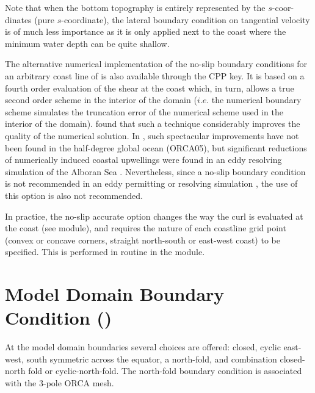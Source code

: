 \documentclass[NEMO_book]{subfiles}
\begin{document}
Note that when the bottom topography is entirely represented by the $s$-coor-dinates 
(pure $s$-coordinate), the lateral boundary condition on tangential velocity is of much 
less importance as it is only applied next to the coast where the minimum water depth 
can be quite shallow.

The alternative numerical implementation of the no-slip boundary conditions for an 
arbitrary coast line of \citet{Shchepetkin1996} is also available through the 
 CPP key. It is based on a fourth order evaluation of the shear at the 
coast which, in turn, allows a true second order scheme in the interior of the domain 
($i.e.$ the numerical boundary scheme simulates the truncation error of the numerical 
scheme used in the interior of the domain). \citet{Shchepetkin1996} found that such a 
technique considerably improves the quality of the numerical solution. In \NEMO, such 
spectacular improvements have not been found in the half-degree global ocean 
(ORCA05), but significant reductions of numerically induced coastal upwellings were 
found in an eddy resolving simulation of the Alboran Sea \citep{Olivier_PhD01}. 
Nevertheless, since a no-slip boundary condition is not recommended in an eddy 
permitting or resolving simulation \citep{Penduff_al_OS07}, the use of this option is also 
not recommended.

In practice, the no-slip accurate option changes the way the curl is evaluated at the 
coast (see  module), and requires the nature of each coastline grid point 
(convex or concave corners, straight north-south or east-west coast) to be specified.  
This is performed in routine  in the  module.

\section{Model Domain Boundary Condition ()}
\label{LBC_jperio}

At the model domain boundaries several choices are offered: closed, cyclic east-west, 
south symmetric across the equator, a north-fold, and combination closed-north fold 
or cyclic-north-fold. The north-fold boundary condition is associated with the 3-pole ORCA mesh. 

\end{document}
